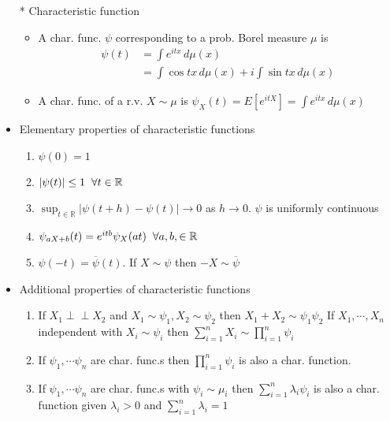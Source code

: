 \documentclass[12pt, A4]{article}
\newcommand{\indep}{\perp \!\!\! \perp}
\begin{document}
\begin{itemize}
	\item[*] Characteristic function
	\begin{itemize}
		\item A char. func. $\psi$ corresponding to a prob. Borel measure $\mu$ is
		\begin{equation*}
			\begin{split}
				\psi(t) &=\int e^{itx}\, d\mu(x) \\
				&= \int \cos tx\,d\mu(x)+i\int \sin tx\,d\mu(x)
			\end{split}
		\end{equation*}
		\item A char. func. of a r.v. $X\sim\mu$ is $\psi_X(t)=E[e^{itX}]=\int e^{itx}\,d\mu(x)$ 
	\end{itemize}
	\item Elementary properties of characteristic functions
	\begin{enumerate}
		\item $\psi(0)=1$
		\item $|\psi(t)|\leq 1 \hspace{0.2cm} \forall t\in \mathbb{R}$
		\item $\sup_{t\in \mathbb{R}}|\psi(t+h)-\psi(t)|\rightarrow 0$ as $h\rightarrow 0$. \hspace{0.2cm}$\psi$ is uniformly continuous
		\item $\psi_{aX+b}(t)=e^{itb}\psi_{X}(at) \hspace{0.2cm} \forall a,b,\in \mathbb{R}$
		\item $\psi(-t)=\overline{\psi}(t)$. \hspace{0.2cm} If $X\sim \psi$ then $-X\sim \overline{\psi}$
	\end{enumerate}
	\item Additional properties of characteristic functions
	\begin{enumerate}
		\item If $X_1 \indep X_2$ and $X_1\sim \psi_1, X_2\sim \psi_2$ then $X_1+X_2\sim \psi_1\psi_2$ \newline If $X_1,\cdots, X_n$ independent with $X_i\sim \psi_i$ then $\sum_{i=1}^{n}X_i\sim \prod_{i=1}^{n}\psi_i$
		\item If $\psi_1, \cdots \psi_n$ are char. func.s then $\prod_{i=1}^{n}\psi_i$ is also a char. function.
		\item If $\psi_1, \cdots \psi_n$ are char. func.s with $\psi_i \sim \mu_i$ then $\sum_{i=1}^{n}\lambda_i\psi_i$ is also a char. function given $\lambda_i>0$ and $\sum_{i=1}^{n}\lambda_i=1$

\end{enumerate}
\end{itemize}
\end{document}
